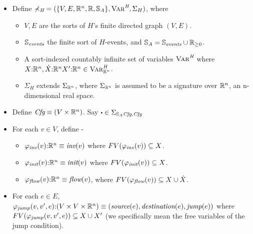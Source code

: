 \documentclass[]{article}
\begin{document}
\begin{itemize}
  \item Define $\mathbb{\Sigma_\textit{H}} = (\{V, E, \mathbb{R}^{n}, \mathbb{R}, \mathbb{S}_{A}\}, \textsc{Var}^\textit{H}, \Sigma_H)$, where
    \begin{itemize}
      \item $V, E$ are the sorts of $H$'s finite directed graph $(V,E)$.
      \item $\mathbb{S}_{\textit{events}}$ the finite sort of $H$-events, and $\mathbb{S}_{A} =
        \mathbb{S}_{\textit{events}} \cup \mathbb{R}_{\geq 0}$.
      \item A sort-indexed countably infinite set of variables $\textsc{Var}^\textit{H}$ where
        $X\mathord{:} \mathbb{R}^{n}, \dot{X} \mathord{:} \mathbb{R}^{n} X' \mathord{:} \mathbb{R}^{n} \in \textsc{Var}^\textit{H}_{\mathbb{R}^{n}} $.
      \item $\Sigma_H$ extends $\Sigma_{\mathbb{R}^{n}}$, where
        $\Sigma_{\mathbb{R}^{n}}$ is assumed to be a signature over $\mathbb{R}^{n}$, an
        n-dimensional real space.
    \end{itemize}
  \item Define $\textit{Cfg} \equiv (V \times \mathbb{R}^{n})$. Say $\sbullet \in
    \Sigma_{\sortA \sortCfg, \sortCfg}$
  \item For each $v \in V$, define -
    \begin{itemize}
      \item $\varphi_{\textit{inv}}(v) \mathord{:} \mathbb{R}^{n} \equiv \textit{inv}(v)$ where $FV(\varphi_{\textit{inv}}(v)) \subseteq
        X$.
      \item $\varphi_{\textit{init}}(v) \mathord{:} \mathbb{R}^{n} \equiv \textit{init}(v)$ where $FV(\varphi_{\textit{init}}(v))
        \subseteq X$.
      \item $\varphi_{\textit{flow}}(v) \mathord{:} \mathbb{R}^{n} \equiv \textit{flow}(v)$, where $FV(\varphi_{\textit{flow}}(v)) \subseteq X \cup \dot{X}$.
    \end{itemize}
  \item For each $e \in E$, $\varphi_{\textit{jump}}(v,v',e) \mathord{:} (V \times V \times \mathbb{R}^{n}) \equiv
        (\textit{source}(e), \textit{destination}(e), \textit{jump}(e)) $ where
        $FV(\varphi_{\textit{jump}}(v,v',e)) \subseteq X \cup X'$ (we
        specifically mean the free variables of the jump condition).
\end{itemize}






%
\end{document}
